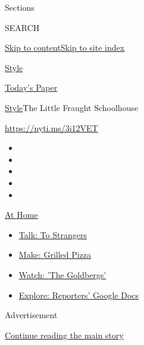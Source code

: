 Sections

SEARCH

\protect\hyperlink{site-content}{Skip to
content}\protect\hyperlink{site-index}{Skip to site index}

\href{https://www.nytimes.com/section/style}{Style}

\href{https://myaccount.nytimes.com/auth/login?response_type=cookie\&client_id=vi}{}

\href{https://www.nytimes.com/section/todayspaper}{Today's Paper}

\href{/section/style}{Style}\textbar{}The Little Fraught Schoolhouse

\url{https://nyti.ms/3i12VET}

\begin{itemize}
\item
\item
\item
\item
\item
\end{itemize}

\href{https://www.nytimes.com/spotlight/at-home?action=click\&pgtype=Article\&state=default\&region=TOP_BANNER\&context=at_home_menu}{At
Home}

\begin{itemize}
\tightlist
\item
  \href{https://www.nytimes.com/2020/08/03/well/family/the-benefits-of-talking-to-strangers.html?action=click\&pgtype=Article\&state=default\&region=TOP_BANNER\&context=at_home_menu}{Talk:
  To Strangers}
\item
  \href{https://www.nytimes.com/2020/08/01/at-home/coronavirus-make-pizza-on-a-grill.html?action=click\&pgtype=Article\&state=default\&region=TOP_BANNER\&context=at_home_menu}{Make:
  Grilled Pizza}
\item
  \href{https://www.nytimes.com/2020/07/31/arts/television/goldbergs-abc-stream.html?action=click\&pgtype=Article\&state=default\&region=TOP_BANNER\&context=at_home_menu}{Watch:
  'The Goldbergs'}
\item
  \href{https://www.nytimes.com/interactive/2020/at-home/even-more-reporters-editors-diaries-lists-recommendations.html?action=click\&pgtype=Article\&state=default\&region=TOP_BANNER\&context=at_home_menu}{Explore:
  Reporters' Google Docs}
\end{itemize}

Advertisement

\protect\hyperlink{after-top}{Continue reading the main story}

